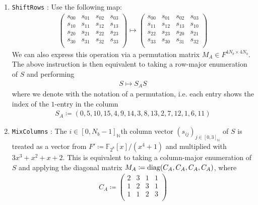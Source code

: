 \begin{enumerate}[label=(\roman*)]
    \item \texttt{ShiftRows} \cite[pp. 37-38]{Daemen_2020}: Use the following map:
    \begin{align}
        \begin{pmatrix}
            s_{00} & s_{01} & s_{02} & s_{03}\\
            s_{10} & s_{11} & s_{12} & s_{13}\\
            s_{20} & s_{21} & s_{22} & s_{23}\\
            s_{30} & s_{31} & s_{32} & s_{33}\\
        \end{pmatrix} \mapsto \begin{pmatrix}
            s_{00} & s_{01} & s_{02} & s_{03}\\
            s_{11} & s_{12} & s_{13} & s_{10}\\
            s_{22} & s_{23} & s_{20} & s_{21}\\
            s_{33} & s_{30} & s_{31} & s_{32}\\
        \end{pmatrix}
    \end{align}
    We can also express this operation via a permutation matrix \(M_A \in F^{4N_b \times 4N_b}\). The above instruction is then equivalent to taking a row-major enumeration of \(S\) and performing
    \begin{align}
        S \mapsto S_A S
    \end{align}
    where we denote with the notation of a permutation, i.e. each entry shows the index of the \(1\)-entry in the column
    \begin{align}
        S_A \coloneqq (0, 5, 10, 15, 4, 9, 14, 3, 8, 13, 2, 7, 12, 1, 6, 11)
    \end{align}
    \item \texttt{MixColumns} \cite[pp. 39-41]{Daemen_2020}: The \(i \in [0, N_b-1]_{\mathbb{N}}\)th column vector \((s_{ij})_{j \in [0, 3]_{\mathbb{N}}}\) of \(S\) is treated as a vector from \(F' \coloneqq \mathbb{F}_{2^8}[x]/(x^4+1)\) and multiplied with \(3x^3+x^2+x+2\). This is equivalent to taking a column-major enumeration of \(S\) and applying the diagonal matrix \(M_A \coloneqq \operatorname{diag}(C_A, C_A, C_A, C_A)\), where
    \begin{align}
        C_A \coloneqq \begin{pmatrix}
            2 & 3 & 1 & 1\\
            1 & 2 & 3 & 1\\
            1 & 1 & 2 & 3\\

\end{pmatrix}
\end{align}
\end{enumerate}
